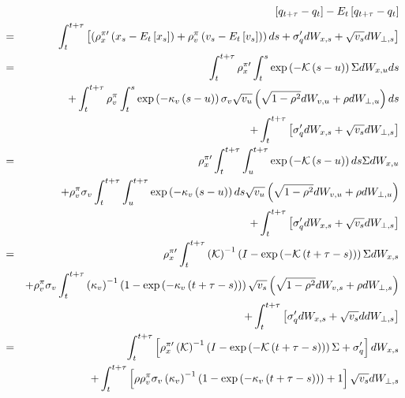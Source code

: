 \documentclass{article}
\begin{document}
\begin{eqnarray*}
&&\left[ q_{t+\tau }-q_{t}\right] -E_{t}\left[ q_{t+\tau }-q_{t}\right] \\
&=&\int_{t}^{t+\tau }\left[ \left( \rho _{x}^{\pi \prime }\left( x_{s}-E_{t}%
\left[ x_{s}\right] \right) +\rho _{v}^{\pi }\left( v_{s}-E_{t}\left[ v_{s}%
\right] \right) \right) ds+\sigma _{q}^{\prime }dW_{x,s}+\sqrt{v_{s}}%
dW_{\bot ,s}\right] \\
&=&\int_{t}^{t+\tau }\rho _{x}^{\pi \prime }\int_{t}^{s}\exp \left( -%
\mathcal{K}\left( s-u\right) \right) \Sigma dW_{x,u}ds \\
&&+\int_{t}^{t+\tau }\rho _{v}^{\pi }\int_{t}^{s}\exp \left( -\kappa
_{v}\left( s-u\right) \right) \sigma _{v}\sqrt{v_{u}}\left( \sqrt{1-\rho ^{2}%
}dW_{v,u}+\rho dW_{\bot ,u}\right) ds \\
&&+\int_{t}^{t+\tau }\left[ \sigma _{q}^{\prime }dW_{x,s}+\sqrt{v_{s}}%
dW_{\bot ,s}\right] \\
&=&\rho _{x}^{\pi \prime }\int_{t}^{t+\tau }\int_{u}^{t+\tau }\exp \left( -%
\mathcal{K}\left( s-u\right) \right) ds\Sigma dW_{x,u} \\
&&+\rho _{v}^{\pi }\sigma _{v}\int_{t}^{t+\tau }\int_{u}^{t+\tau }\exp
\left( -\kappa _{v}\left( s-u\right) \right) ds\sqrt{v_{u}}\left( \sqrt{%
1-\rho ^{2}}dW_{v,u}+\rho dW_{\bot ,u}\right) \\
&&+\int_{t}^{t+\tau }\left[ \sigma _{q}^{\prime }dW_{x,s}+\sqrt{v_{s}}%
dW_{\bot ,s}\right] \\
&=&\rho _{x}^{\pi \prime }\int_{t}^{t+\tau }\left( \mathcal{K}\right)
^{-1}\left( I-\exp \left( -\mathcal{K}\left( t+\tau -s\right) \right)
\right) \Sigma dW_{x,s} \\
&&+\rho _{v}^{\pi }\sigma _{v}\int_{t}^{t+\tau }\left( \kappa _{v}\right)
^{-1}\left( 1-\exp \left( -\kappa _{v}\left( t+\tau -s\right) \right)
\right) \sqrt{v_{s}}\left( \sqrt{1-\rho ^{2}}dW_{v,s}+\rho dW_{\bot
,s}\right) \\
&&+\int_{t}^{t+\tau }\left[ \sigma _{q}^{\prime }dW_{x,s}+\sqrt{v_{s}}%
ddW_{\bot ,s}\right] \\
&=&\int_{t}^{t+\tau }\left[ \rho _{x}^{\pi \prime }\left( \mathcal{K}\right)
^{-1}\left( I-\exp \left( -\mathcal{K}\left( t+\tau -s\right) \right)
\right) \Sigma +\sigma _{q}^{\prime }\right] dW_{x,s} \\
&&+\int_{t}^{t+\tau }\left[ \rho \rho _{v}^{\pi }\sigma _{v}\left( \kappa
_{v}\right) ^{-1}\left( 1-\exp \left( -\kappa _{v}\left( t+\tau -s\right)
\right) \right) +1\right] \sqrt{v_{s}}dW_{\bot ,s} \\

\end{eqnarray*}
\end{document}

